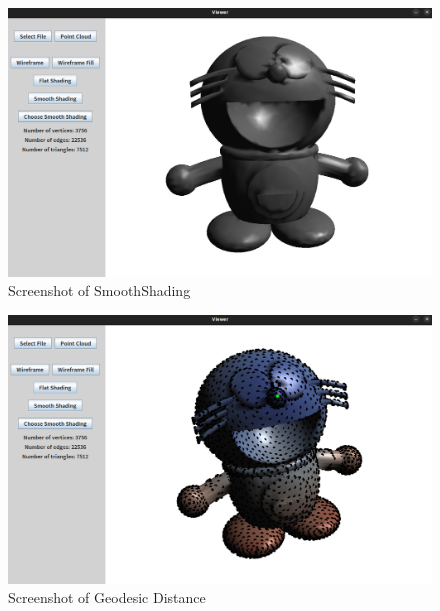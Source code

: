 \documentclass[12pt]{article}
\begin{document}
\begin{figure}[h]
    \centering
    \includegraphics[width=1.0\textwidth]{sc5.png}
    \caption{Screenshot of SmoothShading}
    \label{fig:my_label}
\end{figure}

\begin{figure}[h]
    \centering
    \includegraphics[width=1.0\textwidth]{sc6.png}
    \caption{Screenshot of Geodesic Distance}
    \label{fig:my_label}
\end{figure}
\end{document}
